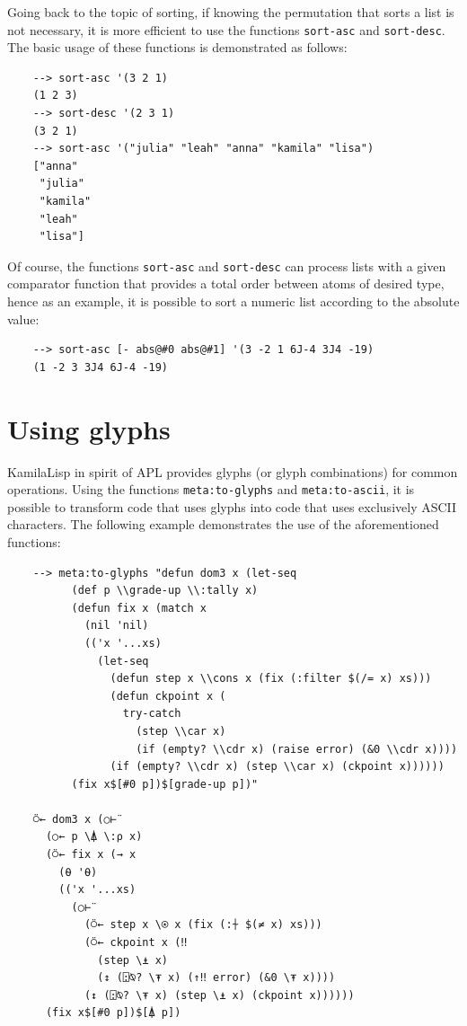 Going back to the topic of sorting, if knowing the permutation that sorts a list is not necessary, it is more efficient to use the functions \verb|sort-asc| and \verb|sort-desc|. The basic usage of these functions is demonstrated as follows:

\begin{Verbatim}
    --> sort-asc '(3 2 1)
    (1 2 3)
    --> sort-desc '(2 3 1)
    (3 2 1)
    --> sort-asc '("julia" "leah" "anna" "kamila" "lisa")
    ["anna"
     "julia"
     "kamila"
     "leah"
     "lisa"]
\end{Verbatim}

Of course, the functions \verb|sort-asc| and \verb|sort-desc| can process lists with a given comparator function that provides a total order between atoms of desired type, hence as an example, it is possible to sort a numeric list according to the absolute value:

\begin{Verbatim}
    --> sort-asc [- abs@#0 abs@#1] '(3 -2 1 6J-4 3J4 -19)
    (1 -2 3 3J4 6J-4 -19)
\end{Verbatim}

\section{Using glyphs}

KamilaLisp in spirit of APL provides glyphs (or glyph combinations) for common operations. Using the functions \verb|meta:to-glyphs| and \verb|meta:to-ascii|, it is possible to transform code that uses glyphs into code that uses exclusively ASCII characters. The following example demonstrates the use of the aforementioned functions:

\begin{Verbatim}
    --> meta:to-glyphs "defun dom3 x (let-seq
          (def p \\grade-up \\:tally x)
          (defun fix x (match x
            (nil 'nil)
            (('x '...xs)
              (let-seq
                (defun step x \\cons x (fix (:filter $(/= x) xs)))
                (defun ckpoint x (
                  try-catch
                    (step \\car x)
                    (if (empty? \\cdr x) (raise error) (&0 \\cdr x))))
                (if (empty? \\cdr x) (step \\car x) (ckpoint x))))))
          (fix x$[#0 p])$[grade-up p])"

    ⍥← dom3 x (○⊢¨
      (○← p \⍋ \:⍴ x)
      (⍥← fix x (→ x
        (⍬ '⍬)
        (('x '...xs)
          (○⊢¨
            (⍥← step x \⍟ x (fix (:⍭ $(≠ x) xs)))
            (⍥← ckpoint x (‼
              (step \⍎ x)
              (↕ (⍠⍉? \⍕ x) (↑‼ error) (&0 \⍕ x))))
            (↕ (⍠⍉? \⍕ x) (step \⍎ x) (ckpoint x))))))
      (fix x$[#0 p])$[⍋ p])
\end{Verbatim}

